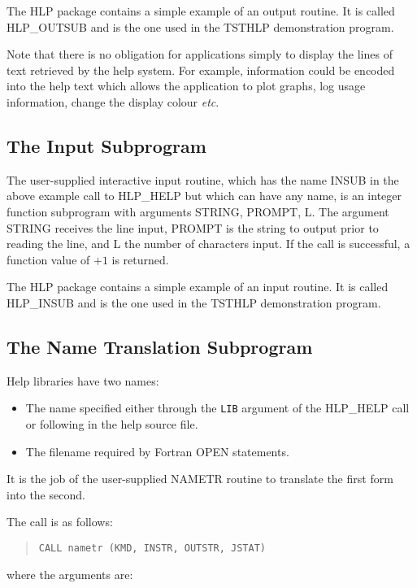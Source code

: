 The HLP package contains a simple example of an output routine.  It
is called HLP\_OUTSUB and is the one used in the TSTHLP demonstration
program.

Note that there is no obligation for applications simply to display
the lines of text retrieved by the help system.  For example,
information could be encoded into the help text which allows the
application to plot graphs, log usage information, change the
display colour {\it etc}.

\subsection{The Input Subprogram}
The user-supplied interactive input routine, which has the name INSUB
in the above
example call to HLP\_HELP but which can have any name, is an
integer function subprogram with arguments STRING, PROMPT, L.
The argument STRING
receives the line input, PROMPT is the string to output prior to
reading the line, and L the number of characters input.  If the
call is successful, a function value of $+1$ is returned.

The HLP package contains a simple example of an input routine.  It
is called HLP\_INSUB and is the one used in the TSTHLP demonstration
program.

\subsection{The Name Translation Subprogram}
Help libraries have two names:
\begin{itemize}
\item The name specified either through the {\tt LIB} argument of the
HLP\_HELP call or following  in the help source file.
\item The filename required by Fortran OPEN statements.
\end{itemize}
It is the job of the user-supplied
NAMETR routine to translate the first form into the second.

The call is as follows:
\begin{verse}
{\tt CALL nametr (KMD, INSTR, OUTSTR, JSTAT)}
\end{verse}
where the arguments are:

